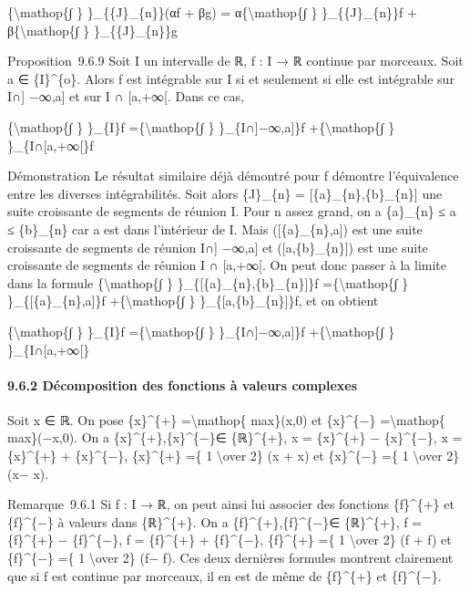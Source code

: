 \documentclass[]{article}
\begin{document}
\{\textbackslash{}mathop\{∫ \} \}\_\{\{J\}\_\{n\}\}(αf + βg) =
α\{\textbackslash{}mathop\{∫ \} \}\_\{\{J\}\_\{n\}\}f +
β\{\textbackslash{}mathop\{∫ \} \}\_\{\{J\}\_\{n\}\}g

Proposition~9.6.9 Soit I un intervalle de ℝ, f : I → ℝ continue par
morceaux. Soit a ∈ \{I\}\^{}\{o\}. Alors f est intégrable sur I si et
seulement si elle est intégrable sur I∩{]} −∞,a{]} et sur I ∩
{[}a,+∞{[}. Dans ce cas,

\{\textbackslash{}mathop\{∫ \} \}\_\{I\}f =\{\textbackslash{}mathop\{∫
\} \}\_\{I∩{]}−∞,a{]}\}f +\{\textbackslash{}mathop\{∫ \}
\}\_\{I∩{[}a,+∞{[}\}f

Démonstration Le résultat similaire déjà démontré pour
\textbar{}f\textbar{} démontre l'équivalence entre les diverses
intégrabilités. Soit alors \{J\}\_\{n\} =
{[}\{a\}\_\{n\},\{b\}\_\{n\}{]} une suite croissante de segments de
réunion I. Pour n assez grand, on a \{a\}\_\{n\} ≤ a ≤ \{b\}\_\{n\} car
a est dans l'intérieur de I. Mais ({[}\{a\}\_\{n\},a{]}) est une suite
croissante de segments de réunion I∩{]} −∞,a{]} et
({[}a,\{b\}\_\{n\}{]}) est une suite croissante de segments de réunion I
∩ {[}a,+∞{[}. On peut donc passer à la limite dans la formule
\{\textbackslash{}mathop\{∫ \} \}\_\{{[}\{a\}\_\{n\},\{b\}\_\{n\}{]}\}f
=\{\textbackslash{}mathop\{∫ \} \}\_\{{[}\{a\}\_\{n\},a{]}\}f
+\{\textbackslash{}mathop\{∫ \} \}\_\{{[}a,\{b\}\_\{n\}{]}\}f, et on
obtient

\{\textbackslash{}mathop\{∫ \} \}\_\{I\}f =\{\textbackslash{}mathop\{∫
\} \}\_\{I∩{]}−∞,a{]}\}f +\{\textbackslash{}mathop\{∫ \}
\}\_\{I∩{[}a,+∞{[}\}

\paragraph{9.6.2 Décomposition des fonctions à valeurs complexes}

Soit x ∈ ℝ. On pose \{x\}\^{}\{+\} =\textbackslash{}mathop\{ max\}(x,0)
et \{x\}\^{}\{−\} =\textbackslash{}mathop\{ max\}(−x,0). On a
\{x\}\^{}\{+\},\{x\}\^{}\{−\}∈ \{ℝ\}\^{}\{+\}, x = \{x\}\^{}\{+\} −
\{x\}\^{}\{−\}, \textbar{}x\textbar{} = \{x\}\^{}\{+\} + \{x\}\^{}\{−\},
\{x\}\^{}\{+\} =\{ 1 \textbackslash{}over 2\} (\textbar{}x\textbar{} +
x) et \{x\}\^{}\{−\} =\{ 1 \textbackslash{}over 2\}
(\textbar{}x\textbar{}− x).

Remarque~9.6.1 Si f : I → ℝ, on peut ainsi lui associer des fonctions
\{f\}\^{}\{+\} et \{f\}\^{}\{−\} à valeurs dans \{ℝ\}\^{}\{+\}. On a
\{f\}\^{}\{+\},\{f\}\^{}\{−\}∈ \{ℝ\}\^{}\{+\}, f = \{f\}\^{}\{+\} −
\{f\}\^{}\{−\}, \textbar{}f\textbar{} = \{f\}\^{}\{+\} + \{f\}\^{}\{−\},
\{f\}\^{}\{+\} =\{ 1 \textbackslash{}over 2\} (\textbar{}f\textbar{} +
f) et \{f\}\^{}\{−\} =\{ 1 \textbackslash{}over 2\}
(\textbar{}f\textbar{}− f). Ces deux dernières formules montrent
clairement que si f est continue par morceaux, il en est de même de
\{f\}\^{}\{+\} et \{f\}\^{}\{−\}.
\end{document}
